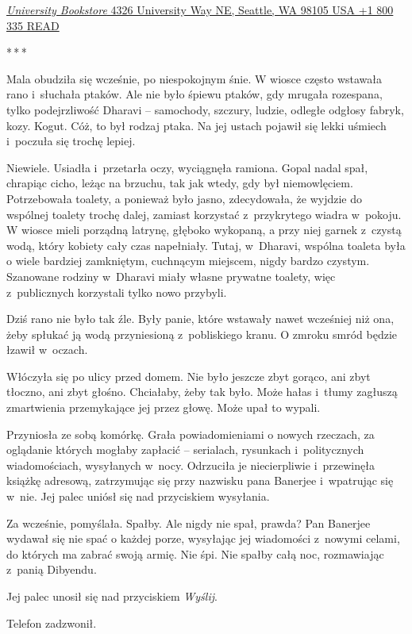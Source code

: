 \documentclass[oneside,polish,11pt,rmheadings]{mwbk}
\newcommand{\threeast}{\par\centerline{*\,*\,*}\medskip\par}
\begin{document}
\href{https://en.wikipedia.org/wiki/HTTP_404}{\textit{University Bookstore } 4326 University Way NE, Seattle, WA 98105 USA +1 800 335 READ }

\bigskip
\threeast

Mala obudziła się wcześnie, po niespokojnym śnie. W wiosce często wstawała rano i~słuchała ptaków. Ale nie było śpiewu ptaków, gdy mrugała rozespana, tylko podejrzliwość Dharavi -- samochody, szczury, ludzie, odległe odgłosy fabryk, kozy. Kogut. Cóż, to był rodzaj ptaka. Na jej ustach pojawił się lekki uśmiech i~poczuła się trochę lepiej. 


Niewiele. Usiadła i~przetarła oczy, wyciągnęła ramiona. Gopal nadal spał, chrapiąc cicho, leżąc na brzuchu, tak jak wtedy, gdy był niemowlęciem. Potrzebowała toalety, a ponieważ było jasno, zdecydowała, że wyjdzie do wspólnej toalety trochę dalej, zamiast korzystać z~przykrytego wiadra w~pokoju. W wiosce mieli porządną latrynę, głęboko wykopaną, a przy niej garnek z~czystą wodą, który kobiety cały czas napełniały. Tutaj, w~Dharavi, wspólna toaleta była o wiele bardziej zamkniętym, cuchnącym miejscem, nigdy bardzo czystym. Szanowane rodziny w~Dharavi miały własne prywatne toalety, więc z~publicznych korzystali tylko nowo przybyli. 


Dziś rano nie było tak źle. Były panie, które wstawały nawet wcześniej niż ona, żeby spłukać ją wodą przyniesioną z~pobliskiego kranu. O zmroku smród będzie łzawił w~oczach. 


Włóczyła się po ulicy przed domem. Nie było jeszcze zbyt gorąco, ani zbyt tłoczno, ani zbyt głośno. Chciałaby, żeby tak było. Może hałas i~tłumy zagłuszą zmartwienia przemykające jej przez głowę. Może upał to wypali. 


Przyniosła ze sobą komórkę. Grała powiadomieniami o nowych rzeczach, za oglądanie których mogłaby zapłacić -- serialach, rysunkach i~politycznych wiadomościach, wysyłanych w~nocy. Odrzuciła je niecierpliwie i~przewinęła książkę adresową, zatrzymując się przy nazwisku pana Banerjee i~wpatrując się w~nie. Jej palec uniósł się nad przyciskiem wysyłania. 


Za wcześnie, pomyślała. Spałby. Ale nigdy nie spał, prawda? Pan Banerjee wydawał się nie spać o każdej porze, wysyłając jej wiadomości z~nowymi celami, do których ma zabrać swoją armię. Nie śpi. Nie spałby całą noc, rozmawiając z~panią Dibyendu. 


Jej palec unosił się nad przyciskiem \textit{Wyślij}. 


Telefon zadzwonił. 
\end{document}
